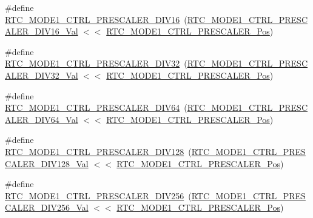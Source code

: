 \begin{DoxyCompactItemize}
\item 
\#define \mbox{\hyperlink{group___s_a_m_d21___r_t_c_ga9004736290d4bb3681f2b485c5d7545e}{R\+T\+C\+\_\+\+M\+O\+D\+E1\+\_\+\+C\+T\+R\+L\+\_\+\+P\+R\+E\+S\+C\+A\+L\+E\+R\+\_\+\+D\+I\+V16}}~(\mbox{\hyperlink{group___s_a_m_d21___r_t_c_gae03a9107edd04d0825cce744ae99b393}{R\+T\+C\+\_\+\+M\+O\+D\+E1\+\_\+\+C\+T\+R\+L\+\_\+\+P\+R\+E\+S\+C\+A\+L\+E\+R\+\_\+\+D\+I\+V16\+\_\+\+Val}} $<$$<$ \mbox{\hyperlink{group___s_a_m_d21___r_t_c_gad44b853d16e29aa5a84f3bb4087a6e1e}{R\+T\+C\+\_\+\+M\+O\+D\+E1\+\_\+\+C\+T\+R\+L\+\_\+\+P\+R\+E\+S\+C\+A\+L\+E\+R\+\_\+\+Pos}})
\item 
\#define \mbox{\hyperlink{group___s_a_m_d21___r_t_c_ga778dc351b1233391480e470fe329176d}{R\+T\+C\+\_\+\+M\+O\+D\+E1\+\_\+\+C\+T\+R\+L\+\_\+\+P\+R\+E\+S\+C\+A\+L\+E\+R\+\_\+\+D\+I\+V32}}~(\mbox{\hyperlink{group___s_a_m_d21___r_t_c_gaadb4e31230473e4f4550379f40fef4f5}{R\+T\+C\+\_\+\+M\+O\+D\+E1\+\_\+\+C\+T\+R\+L\+\_\+\+P\+R\+E\+S\+C\+A\+L\+E\+R\+\_\+\+D\+I\+V32\+\_\+\+Val}} $<$$<$ \mbox{\hyperlink{group___s_a_m_d21___r_t_c_gad44b853d16e29aa5a84f3bb4087a6e1e}{R\+T\+C\+\_\+\+M\+O\+D\+E1\+\_\+\+C\+T\+R\+L\+\_\+\+P\+R\+E\+S\+C\+A\+L\+E\+R\+\_\+\+Pos}})
\item 
\#define \mbox{\hyperlink{group___s_a_m_d21___r_t_c_ga967067f59e42a83a06fa09a41ee6df2e}{R\+T\+C\+\_\+\+M\+O\+D\+E1\+\_\+\+C\+T\+R\+L\+\_\+\+P\+R\+E\+S\+C\+A\+L\+E\+R\+\_\+\+D\+I\+V64}}~(\mbox{\hyperlink{group___s_a_m_d21___r_t_c_ga18388e853dfca859e4f0b0e97c8b66d4}{R\+T\+C\+\_\+\+M\+O\+D\+E1\+\_\+\+C\+T\+R\+L\+\_\+\+P\+R\+E\+S\+C\+A\+L\+E\+R\+\_\+\+D\+I\+V64\+\_\+\+Val}} $<$$<$ \mbox{\hyperlink{group___s_a_m_d21___r_t_c_gad44b853d16e29aa5a84f3bb4087a6e1e}{R\+T\+C\+\_\+\+M\+O\+D\+E1\+\_\+\+C\+T\+R\+L\+\_\+\+P\+R\+E\+S\+C\+A\+L\+E\+R\+\_\+\+Pos}})
\item 
\#define \mbox{\hyperlink{group___s_a_m_d21___r_t_c_gabe7ba3c8fb6e7bdbfb71ba788458c2f5}{R\+T\+C\+\_\+\+M\+O\+D\+E1\+\_\+\+C\+T\+R\+L\+\_\+\+P\+R\+E\+S\+C\+A\+L\+E\+R\+\_\+\+D\+I\+V128}}~(\mbox{\hyperlink{group___s_a_m_d21___r_t_c_gaba4ba3df4dc79b5eba5ec7d8dab4ae5e}{R\+T\+C\+\_\+\+M\+O\+D\+E1\+\_\+\+C\+T\+R\+L\+\_\+\+P\+R\+E\+S\+C\+A\+L\+E\+R\+\_\+\+D\+I\+V128\+\_\+\+Val}} $<$$<$ \mbox{\hyperlink{group___s_a_m_d21___r_t_c_gad44b853d16e29aa5a84f3bb4087a6e1e}{R\+T\+C\+\_\+\+M\+O\+D\+E1\+\_\+\+C\+T\+R\+L\+\_\+\+P\+R\+E\+S\+C\+A\+L\+E\+R\+\_\+\+Pos}})
\item 
\#define \mbox{\hyperlink{group___s_a_m_d21___r_t_c_gaa32c45bcdf15d06d533a96d2862b7931}{R\+T\+C\+\_\+\+M\+O\+D\+E1\+\_\+\+C\+T\+R\+L\+\_\+\+P\+R\+E\+S\+C\+A\+L\+E\+R\+\_\+\+D\+I\+V256}}~(\mbox{\hyperlink{group___s_a_m_d21___r_t_c_ga1e9625562860c2b9b30668dc9ee77b9f}{R\+T\+C\+\_\+\+M\+O\+D\+E1\+\_\+\+C\+T\+R\+L\+\_\+\+P\+R\+E\+S\+C\+A\+L\+E\+R\+\_\+\+D\+I\+V256\+\_\+\+Val}} $<$$<$ \mbox{\hyperlink{group___s_a_m_d21___r_t_c_gad44b853d16e29aa5a84f3bb4087a6e1e}{R\+T\+C\+\_\+\+M\+O\+D\+E1\+\_\+\+C\+T\+R\+L\+\_\+\+P\+R\+E\+S\+C\+A\+L\+E\+R\+\_\+\+Pos}})
$$
\end{DoxyCompactItemize}
